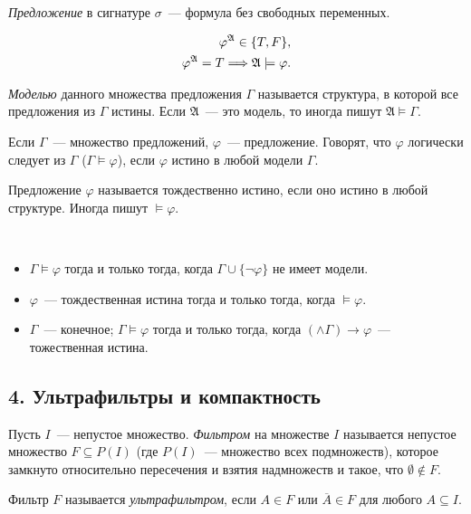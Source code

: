 \begin{definition}
    \textit{Предложение} в сигнатуре $\sigma$~— формула без свободных переменных.  

    \begin{equation*}
        \begin{aligned}
            \varphi^{\mathfrak{A}} \in \{T, F\}, \\ 
            \varphi^{\mathfrak{A}} = T \Longrightarrow \mathfrak{A} \models \varphi.
        \end{aligned}
    \end{equation*}
\end{definition}

\begin{definition} 
    \textit{Моделью} данного множества предложения $\Gamma$ называется структура, в которой все предложения из $\Gamma$ истины. Если $\mathfrak{A}$~— это модель, то иногда пишут $\mathfrak{A} \models \Gamma$. 

    Если $\Gamma$~— множество предложений, $\varphi$~— предложение. Говорят, что $\varphi$ логически следует из $\Gamma$ ($\Gamma \models \varphi$), если $\varphi$ истино в любой модели $\Gamma$. 
\end{definition} 

\begin{definition}
    Предложение $\varphi$ называется тождественно истино, если оно истино в любой структуре. Иногда пишут $\models \varphi$. 
\end{definition}

\begin{stat} \ 
    \begin{itemize}
        \item $\Gamma \models \varphi$ тогда и только тогда, когда $\Gamma \cup \{\neg \varphi\}$ не имеет модели. 
        \item $\varphi$~— тождественная истина тогда и только тогда, когда $\models \varphi$. 
        \item $\Gamma$~— конечное; $\Gamma \models \varphi$ тогда и только тогда, когда $(\wedge \Gamma) \to \varphi$~— тожественная истина.
    \end{itemize}
\end{stat} 

\subsection{4. Ультрафильтры и компактность} 

\begin{definition}
    Пусть $I$~— непустое множество. \textit{Фильтром} на множестве $I$ называется непустое множество $F \subseteq P(I)$ (где $P(I)$~— множество всех подмножеств), которое замкнуто относительно пересечения и взятия надмножеств и такое, что $\emptyset \notin F$.  

    Фильтр $F$ называется \textit{ультрафильтром}, если $A \in F$ или $\overline{A} \in F$ для любого $A \subseteq I$. 
\end{definition} 

